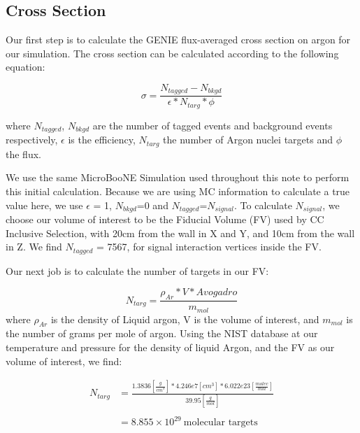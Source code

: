 \clearpage
\subsection{Cross Section}

Our first step is to calculate the GENIE flux-averaged cross section on argon for our simulation. The cross section can be calculated according to the following equation:

\begin{equation}
  \sigma = \frac{N_{tagged} - N_{bkgd}}{\epsilon*N_{targ}*\phi}
\end{equation}

\noindent where $N_{tagged}$, $N_{bkgd}$ are the number of tagged events and background events respectively, $\epsilon$ is the efficiency, $N_{targ}$ the number of Argon nuclei targets and $\phi$ the flux. 
\par We use the same MicroBooNE Simulation used throughout this note to perform this initial calculation.  Because we are using MC information to calculate a true value here, we use $\epsilon$ = 1, $N_{bkgd}$=0 and $N_{tagged}$=$N_{signal}$.  To calculate $N_{signal}$, we choose our volume of interest to be the Fiducial Volume (FV) used by CC Inclusive Selection, with 20cm from the wall in X and Y, and 10cm from the wall in Z. We find $N_{tagged}$ = 7567, for signal interaction vertices inside the FV. 
\par Our next job is to calculate the number of targets in our FV:

\begin{equation} \label{eq:1}
  N_{targ} = \frac{\rho_{Ar} * V * Avogadro}{m_{mol}} 
\end{equation}
\noindent where $\rho_{Ar}$ is the density of Liquid argon, V is the volume of interest, and $m_{mol}$ is the number of grams per mole of argon.  Using the NIST database at our temperature and pressure for the density of liquid Argon, and the FV as our volume of interest, we find: 

\begin{align}
N_{targ} &= \frac{1.3836 [\frac{g}{cm^3}] * 4.246e7 [cm^3] * 6.022e23 [\frac{molec}{mol}]}{39.95 [\frac{g}{mol}]} \\\\
&= 8.855\times10^{29}~\text{molecular targets}
\end{align}

